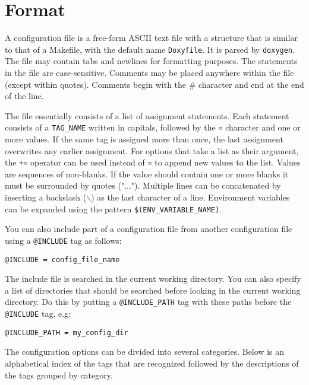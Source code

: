 \hypertarget{config_config_format}{}\section{Format}\label{config_config_format}
A configuration file is a free-form ASCII text file with a structure that is similar to that of a Makefile, with the default name {\tt Doxyfile}. It is parsed by {\tt doxygen}. The file may contain tabs and newlines for formatting purposes. The statements in the file are case-sensitive. Comments may be placed anywhere within the file (except within quotes). Comments begin with the \# character and end at the end of the line.

The file essentially consists of a list of assignment statements. Each statement consists of a {\tt TAG\_\-NAME} written in capitals, followed by the {\tt =} character and one or more values. If the same tag is assigned more than once, the last assignment overwrites any earlier assignment. For options that take a list as their argument, the {\tt +=} operator can be used instead of {\tt =} to append new values to the list. Values are sequences of non-blanks. If the value should contain one or more blanks it must be surrounded by quotes ("..."). Multiple lines can be concatenated by inserting a backslash ($\backslash$) as the last character of a line. Environment variables can be expanded using the pattern {\tt \$(ENV\_\-VARIABLE\_\-NAME)}.

You can also include part of a configuration file from another configuration file using a {\tt @INCLUDE} tag as follows: 

\footnotesize\begin{verbatim}
@INCLUDE = config_file_name
\end{verbatim}
\normalsize
 The include file is searched in the current working directory. You can also specify a list of directories that should be searched before looking in the current working directory. Do this by putting a {\tt @INCLUDE\_\-PATH} tag with these paths before the {\tt @INCLUDE} tag, e.g: 

\footnotesize\begin{verbatim}
@INCLUDE_PATH = my_config_dir
\end{verbatim}
\normalsize


The configuration options can be divided into several categories. Below is an alphabetical index of the tags that are recognized followed by the descriptions of the tags grouped by category.

